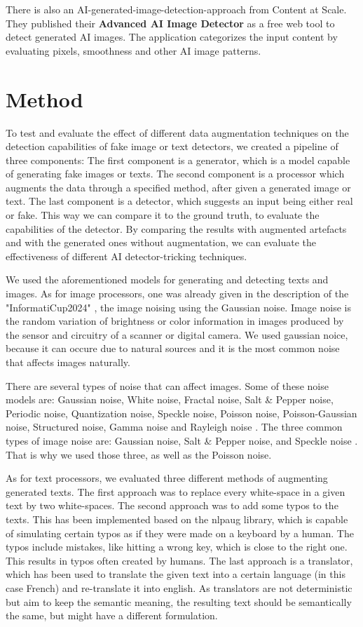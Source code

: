 \documentclass{article} %
\begin{document}
There is also an AI-generated-image-detection-approach from Content at Scale. They published their \textbf{Advanced AI Image Detector} as a free web tool to detect generated AI images. The application categorizes the input content by evaluating pixels, smoothness and other AI image patterns. \cite{ContentAtScale2024Advanced}


\section{Method}
To test and evaluate the effect of different data augmentation techniques on the detection capabilities of fake image or text detectors, we created a pipeline of three components: The first component is a generator, which is a model capable of generating fake images or texts. The second component is a processor which augments the data through a specified method, after given a generated image or text. The last component is a detector, which suggests an input being either real or fake. This way we can compare it to the ground truth, to evaluate the capabilities of the detector. By comparing the results with augmented artefacts and with the generated ones without augmentation, we can evaluate the effectiveness of different AI detector-tricking techniques.

We used the aforementioned models for generating and detecting texts and images. As for image processors, one was already given in the description of the "InformatiCup2024" \cite{InformatiCup}, the image noising using the Gaussian noise. Image noise is the random variation of brightness or color information in images produced by the sensor and circuitry of a scanner or digital camera. We used gaussian noice, because it can occure due to natural sources and it is the most common noise that affects images naturally. \cite{mohammed2016study}

There are several types of noise that can affect images. Some of these noise models are: Gaussian noise, White noise, Fractal noise, Salt \& Pepper noise, Periodic noise, Quantization noise, Speckle noise, Poisson noise, Poisson-Gaussian noise, Structured noise, Gamma noise and Rayleigh noise \cite{gonzalez2009digital}. The three common types of image noise are: Gaussian noise, Salt \& Pepper noise, and Speckle noise \cite{al2010comparative}. That is why we used those three, as well as the Poisson noise.

As for text processors, we evaluated three different methods of augmenting generated texts. The first approach was to replace every white-space in a given text by two white-spaces. The second approach was to add some typos to the texts. This has been implemented based on the nlpaug library, which is capable of simulating certain typos as if they were made on a keyboard by a human. The typos include mistakes, like hitting a wrong key, which is close to the right one. This results in typos often created by humans. The last approach is a translator, which has been used to translate the given text into a certain language (in this case French) and re-translate it into english. As translators are not deterministic but aim to keep the semantic meaning, the resulting text should be semantically the same, but might have a different formulation.
\end{document}
